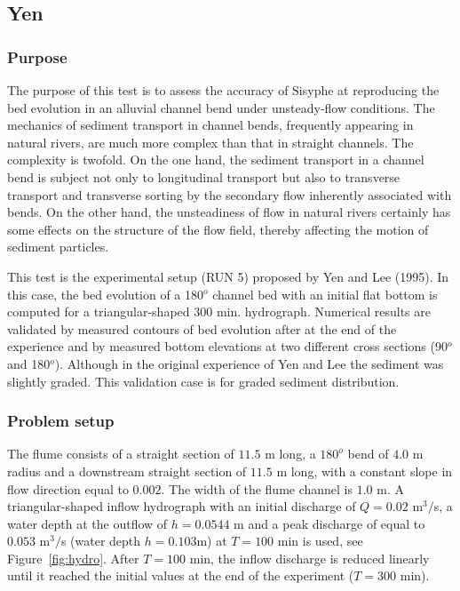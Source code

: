 \subsection{Yen}
%

%
\subsubsection{Purpose}
%
The purpose of this test is to assess the accuracy of Sisyphe at reproducing the bed evolution in an alluvial channel bend under 
unsteady-flow conditions. The mechanics of sediment transport in channel bends, frequently appearing in natural rivers, are much
 more complex than that in straight channels. The complexity is twofold. On the one hand, the sediment transport in a channel bend 
is subject not only to longitudinal transport but also to transverse transport and transverse sorting by the secondary flow 
inherently associated with bends. On the other hand, the unsteadiness of flow in natural rivers certainly has some effects on the 
structure of the flow field, thereby affecting the motion of sediment particles.

This test is the experimental setup (RUN 5) proposed by Yen and Lee (1995). In this case, the bed evolution of a 180$^o$ channel 
bed with an initial flat bottom is computed for a triangular-shaped $300$ min. hydrograph. Numerical results are validated by 
measured contours of bed evolution after at the end of the experience and by measured bottom elevations at
two different cross sections (90$^o$ and 180$^o$). Although in the original experience of Yen and Lee the sediment was slightly 
graded. This validation case is for graded sediment distribution. 
%
\subsubsection{Problem setup}
%
The flume consists of a straight section of $11.5$ m
long, a $180^o$ bend of $4.0$ m radius and a downstream straight section of
$11.5$ m long, with a constant slope in flow direction equal to $0.002$. The width of the flume channel is $1.0$ m. A 
triangular-shaped inflow hydrograph with an initial discharge of $Q=0.02$ m$^3/$s, a water depth at the outflow of $h = 0.0544$ m 
and a peak discharge of equal to $0.053$ m$^3/$s (water depth $h=0.103$m) at $T = 100$ min
is used, see Figure~\ref{fig:hydro}. After $T = 100$ min, the inflow discharge is reduced linearly until it reached the 
initial values at the end of the experiment ($T = 300$ min).

